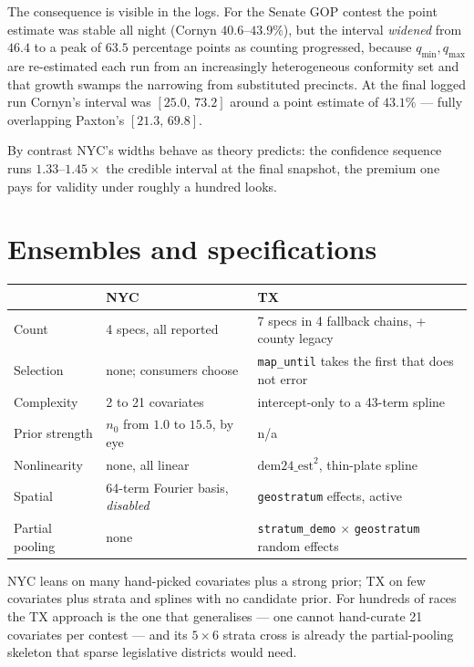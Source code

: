 \documentclass[11pt]{article}
\begin{document}
\noindent The consequence is visible in the logs. For the Senate GOP contest the point
estimate was stable all night (Cornyn $40.6$--$43.9\%$), but the interval \emph{widened}
from $46.4$ to a peak of $63.5$ percentage points as counting progressed, because $q_{\min},q_{\max}$
are re-estimated each run from an increasingly heterogeneous conformity set and that growth
swamps the narrowing from substituted precincts. At the final logged run Cornyn's interval
was $[25.0,\,73.2]$ around a point estimate of $43.1\%$ --- fully overlapping Paxton's
$[21.3,\,69.8]$.

By contrast NYC's widths behave as theory predicts: the confidence sequence runs
$1.33$--$1.45\times$ the credible interval at the final snapshot, the premium one pays for
validity under roughly a hundred looks.

\section{Ensembles and specifications}\label{sec:ens}

\begin{table}[ht]
\centering
\small
\begin{tabular}{@{}L{3.0cm}L{5.4cm}L{5.4cm}@{}}
\toprule
 & \textbf{NYC} & \textbf{TX} \\
\midrule
Count & 4 specs, all reported & 7 specs in 4 fallback chains, + county legacy \\
Selection & none; consumers choose & \texttt{map\_until} takes the first that does not error \\
Complexity & 2 to 21 covariates & intercept-only to a 43-term spline \\
Prior strength & $n_0$ from $1.0$ to $15.5$, by eye & n/a \\
Nonlinearity & none, all linear & $\textrm{dem24\_est}^2$, thin-plate spline \\
Spatial & 64-term Fourier basis, \emph{disabled} & \texttt{geostratum} effects, active \\
Partial pooling & none & \texttt{stratum\_demo} $\times$ \texttt{geostratum} random effects \\
\bottomrule
\end{tabular}
\end{table}

\noindent NYC leans on many hand-picked covariates plus a strong prior; TX on few
covariates plus strata and splines with no candidate prior. For hundreds of races the TX
approach is the one that generalises --- one cannot hand-curate 21 covariates per contest
--- and its $5 \times 6$ strata cross is already the partial-pooling skeleton that sparse
legislative districts would need.
\end{document}
